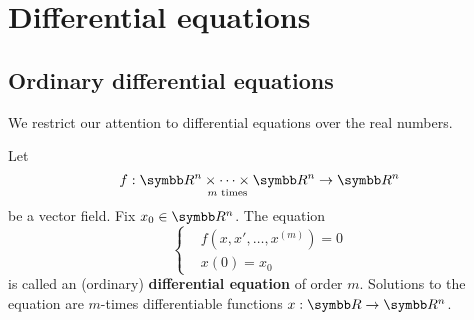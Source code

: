 \section{Differential equations}\label{sec:diffeq}
\subsection{Ordinary differential equations}\label{subsec:ordinary_differential_equations}

\begin{remark}\label{remark:real_ode}
  We restrict our attention to differential equations over the real numbers.
\end{remark}

\begin{definition}\label{def:ode}
  Let
  \begin{equation*}
    f: \underset {m \text{ times}} {\BB{R}^n \times \cdots \times \BB{R}^n} \to \BB{R}^n
  \end{equation*}
  be a vector field. Fix \( x_0 \in \BB{R}^n \). The equation
  \begin{equation*}
    \begin{cases}
      &f(x, x', \ldots, x^{(m)}) = 0 \\
      &x(0) = x_0
    \end{cases}
  \end{equation*}
  is called an (ordinary) \textbf{differential equation} of order \( m \). Solutions to the equation are \( m \)-times differentiable functions \( x: \BB{R} \to \BB{R^n} \).
\end{definition}
